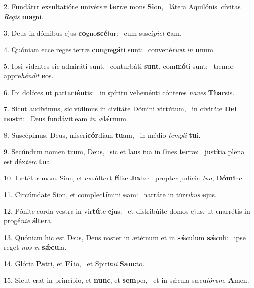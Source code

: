 2. Fundátur exsultatióne univérsæ \textbf{ter}ræ mons \textbf{Si}on, \ast\  látera Aquilónis, cívitas \textit{Re}\textit{gis} \textbf{ma}gni.\

3. Deus in dómibus ejus \textbf{co}gno\textbf{scé}tur: \ast\  cum suscí\textit{pi}\textit{et} \textbf{e}am.\

4. Quóniam ecce reges terræ \textbf{con}gre\textbf{gá}ti sunt: \ast\  convené\textit{runt} \textit{in} \textbf{u}num.\

5. Ipsi vidéntes sic admiráti sunt, \dag\  conturbáti \textbf{sunt}, com\textbf{mó}ti sunt: \ast\  tremor appre\textit{hén}\textit{dit} \textbf{e}os.\

6. Ibi dolóres ut par\textbf{tu}ri\textbf{én}tis: \ast\  in spíritu veheménti cónteres \textit{na}\textit{ves} \textbf{Thar}sis.\

7. Sicut audívimus, sic vídimus in civitáte Dómini virtútum, \dag\  in civitáte \textbf{De}i \textbf{nos}tri: \ast\  Deus fundávit eam \textit{in} \textit{æ}\textbf{tér}num.\

8. Suscépimus, Deus, miseri\textbf{cór}diam \textbf{tu}am, \ast\  in médio \textit{tem}\textit{pli} \textbf{tu}i.\

9. Secúndum nomen tuum, Deus, \dag\  sic et laus tua in \textbf{fi}nes \textbf{ter}ræ: \ast\  justítia plena est déx\textit{te}\textit{ra} \textbf{tu}a.\

10. Lætétur mons Sion, et exsúltent \textbf{fí}liæ \textbf{Ju}dæ: \ast\  propter judícia \textit{tu}\textit{a}, \textbf{Dó}\textbf{mi}ne.\

11. Circúmdate Sion, et complec\textbf{tí}mini \textbf{e}am: \ast\  narráte in túr\textit{ri}\textit{bus} \textbf{e}jus.\

12. Pónite corda vestra in vir\textbf{tú}te \textbf{e}jus: \ast\  et distribúite domos ejus, ut enarrétis in progé\textit{ni}\textit{e} \textbf{ál}\textbf{te}ra.\

13. Quóniam hic est Deus, Deus noster in ætérnum et in \textbf{sǽ}culum \textbf{sǽ}culi: \ast\  ipse reget \textit{nos} \textit{in} \textbf{sǽ}\textbf{cu}la.\

14. Glória \textbf{Pa}tri, et \textbf{Fí}lio, \ast\  et Spirí\textit{tu}\textit{i} \textbf{Sanc}to.\

15. Sicut erat in princípio, et \textbf{nunc}, et \textbf{sem}per, \ast\  et in sǽcula sæcu\textit{ló}\textit{rum}. \textbf{A}men.\

